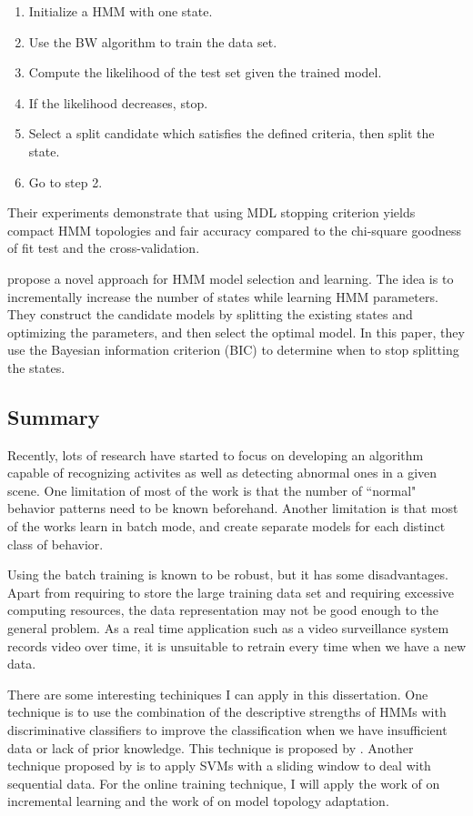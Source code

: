 \begin{enumerate}
  \item Initialize a HMM with one state.
  \item Use the BW algorithm to train the data set.
  \item Compute the likelihood of the test set given the trained model.
  \item If the likelihood decreases, stop.
  \item Select a split candidate which satisfies the defined criteria, then split the state.
  \item Go to step 2.
\end{enumerate}

Their experiments demonstrate that using MDL stopping criterion yields
compact HMM topologies and fair accuracy compared to the chi-square
goodness of fit test and the cross-validation.

 propose a novel approach for HMM
model selection and learning. The idea is to incrementally increase
the number of states while learning HMM parameters. They construct the
candidate models by splitting the existing states and optimizing the
parameters, and then select the optimal model. In this paper, they use
the Bayesian information criterion (BIC)  to
determine when to stop splitting the states.

\subsection{Summary}

Recently, lots of research have started to focus on developing an
algorithm capable of recognizing activites as well as detecting
abnormal ones in a given scene. One limitation of most of the work is
that the number of ``normal" behavior patterns need to be known
beforehand. Another limitation is that most of the works learn in
batch mode, and create separate models for each distinct class of
behavior.

Using the batch training is known to be robust, but it has some
disadvantages. Apart from requiring to store the large training data
set and requiring excessive computing resources, the data
representation may not be good enough to the general problem. As a
real time application such as a video surveillance system records
video over time, it is unsuitable to retrain every time when we have a
new data.

There are some interesting techiniques I can apply in this
dissertation. One technique is to use the combination of the
descriptive strengths of HMMs with discriminative classifiers to
improve the classification when we have insufficient data or lack of
prior knowledge. This technique is proposed
by . Another technique proposed
by  is to apply SVMs with a sliding window
to deal with sequential data. For the online training technique, I
will apply the work of  on incremental
learning and the work of  on model
topology adaptation.

